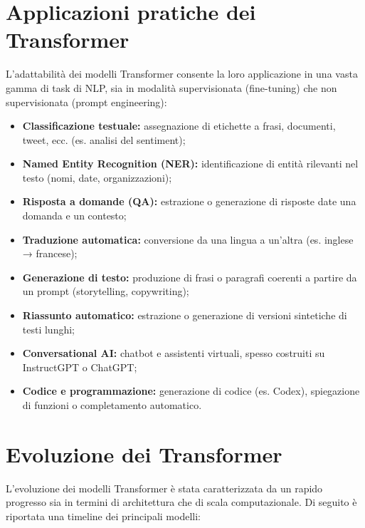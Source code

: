 \section{Applicazioni pratiche dei Transformer}

L’adattabilità dei modelli Transformer consente la loro applicazione in una vasta gamma di task di NLP, sia in modalità supervisionata (fine-tuning) che non supervisionata (prompt engineering):

\begin{itemize}
    \item \textbf{Classificazione testuale:} assegnazione di etichette a frasi, documenti, tweet, ecc. (es. analisi del sentiment);
    \item \textbf{Named Entity Recognition (NER):} identificazione di entità rilevanti nel testo (nomi, date, organizzazioni);
    \item \textbf{Risposta a domande (QA):} estrazione o generazione di risposte date una domanda e un contesto;
    \item \textbf{Traduzione automatica:} conversione da una lingua a un’altra (es. inglese → francese);
    \item \textbf{Generazione di testo:} produzione di frasi o paragrafi coerenti a partire da un prompt (storytelling, copywriting);
    \item \textbf{Riassunto automatico:} estrazione o generazione di versioni sintetiche di testi lunghi;
    \item \textbf{Conversational AI:} chatbot e assistenti virtuali, spesso costruiti su InstructGPT o ChatGPT;
    \item \textbf{Codice e programmazione:} generazione di codice (es. Codex), spiegazione di funzioni o completamento automatico.
\end{itemize}

\section{Evoluzione dei Transformer}

L’evoluzione dei modelli Transformer è stata caratterizzata da un rapido progresso sia in termini di architettura che di scala computazionale. Di seguito è riportata una timeline dei principali modelli:

